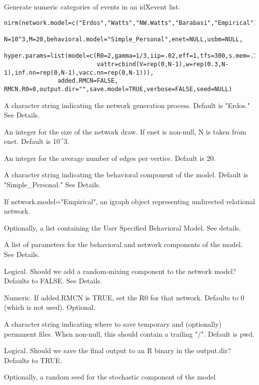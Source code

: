 \documentclass[letterpaper]{book}
\begin{document}
%
\begin{SeeAlso}\relax
{}
\end{SeeAlso}
%
\begin{Description}\relax
Generate numeric categories of events in an idXevent list.
\end{Description}
%
\begin{Usage}
\begin{verbatim}
nirm(network.model=c("Erdos","Watts","NW.Watts","Barabasi","Empirical"),
               N=10^3,M=20,behavioral.model="Simple_Personal",enet=NULL,usbm=NULL,
               hyper.params=list(model=c(R0=2,gamma=1/3,iip=.02,eff=1,tfs=300,s.mem=.7),
                          vattr=cbind(V=rep(0,N-1),w=rep(0.3,N-1),inf.nn=rep(0,N-1),vacc.nn=rep(0,N-1))),
               added.RMCN=FALSE, RMCN.R0=0,output.dir="",save.model=TRUE,verbose=FALSE,seed=NULL)
\end{verbatim}
\end{Usage}
%
\begin{Arguments}
\begin{ldescription}
\item[\code{network.model}] A character string indicating the network generation process. Default is "Erdos." See Details.
\item[\code{N}] An integer for the size of the network draw. If enet is non-null, N is taken from enet. Default is 10\textasciicircum{}3.
\item[\code{M}] An integer for the average number of edges per vertice. Default is 20.
\item[\code{behavioral.model}] A character string indicating the behavioral component of the model. Default is "Simple\_Personal." See Details.
\item[\code{enet}] If network.model="Empirical", an igraph object representing undirected relational network.
\item[\code{usbm}] Optionally, a list containing the User Specified Behavioral Model. See details.
\item[\code{hyper.params}] A list of parameters for the behavioral and network components of the model. See Details.
\item[\code{added.RMCN}] Logical. Should we add a random-mixing component to the network model? Defaults to FALSE. See Details.
\item[\code{RMCN.R0}] Numeric. If added.RMCN is TRUE, set the R0 for that network. Defaults to 0 (which is not used). Optional.
\item[\code{output.dir}] A character string indicating where to save temporary and (optionally) permanent files. When non-null, this should contain a trailing "/". Default is pwd.
\item[\code{save.model}] Logical. Should we save the final output to an R binary in the output.dir? Defaults to TRUE.
\item[\code{seed}] Optionally, a random seed for the stochastic component of the model
\end{ldescription}
\end{Arguments}
\end{document}
